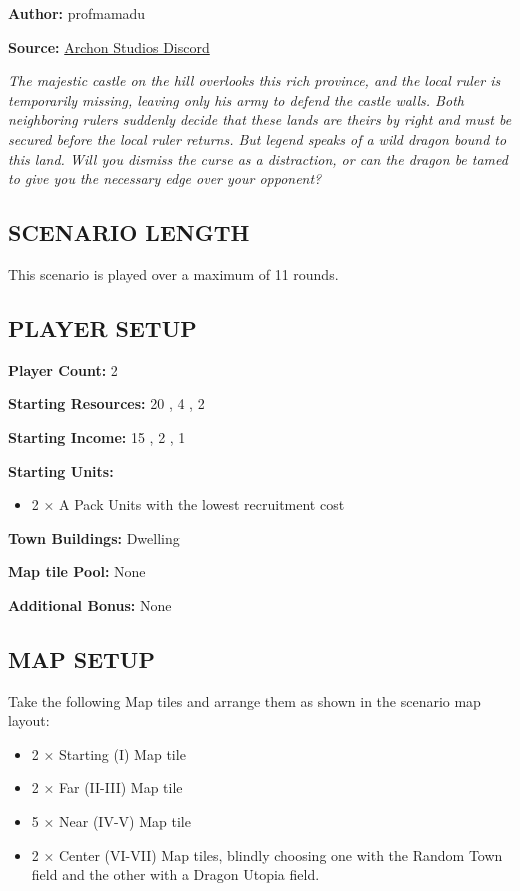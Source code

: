 
\begin{multicols*}{2}

\textbf{Author:} profmamadu

\textbf{Source:} \href{https://discord.com/channels/740870068178649108/1253016693517717714/1253016693517717714}{Archon Studios Discord}

\textit{The majestic castle on the hill overlooks this rich province, and the local ruler is temporarily missing, leaving only his army to defend the castle walls.
Both neighboring rulers suddenly decide that these lands are theirs by right and must be secured before the local ruler returns.
But legend speaks of a wild dragon bound to this land.
Will you dismiss the curse as a distraction, or can the dragon be tamed to give you the necessary edge over your opponent?
}

\subsection*{\MakeUppercase{Scenario Length}}

This scenario is played over a maximum of 11 rounds.

\subsection*{\MakeUppercase{Player Setup}}

\textbf{Player Count:} 2

\textbf{Starting Resources:} 20 , 4 , 2 

\textbf{Starting Income:} 15 , 2 , 1 

\textbf{Starting Units:}
\begin{itemize}
  \item 2 × A Pack  Units with the lowest recruitment cost
\end{itemize}

\textbf{Town Buildings:}  Dwelling

\textbf{Map tile Pool:} None

\textbf{Additional Bonus:} None

\subsection*{\MakeUppercase{Map Setup}}
Take the following Map tiles and arrange them as shown in the scenario map layout:
\begin{itemize}
  \item 2 × Starting (I) Map tile
  \item 2 × Far (II-III) Map tile
  \item 5 × Near (IV-V) Map tile
  \item 2 × Center (VI-VII) Map tiles, blindly choosing one with the Random Town field and the other with a Dragon Utopia field.
\end{itemize}


\end{multicols*}

